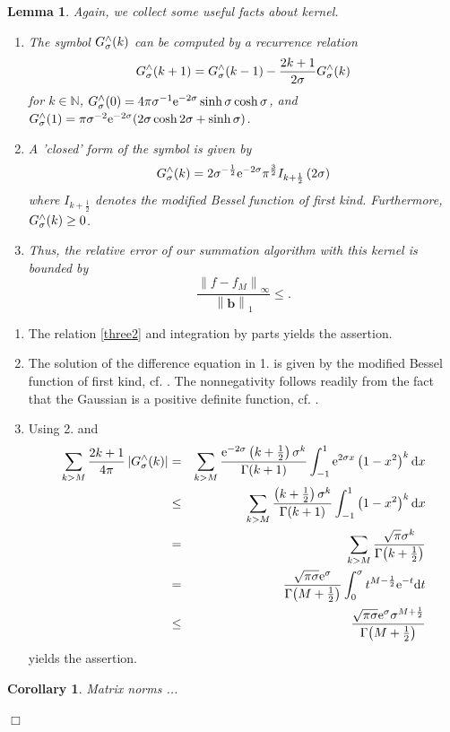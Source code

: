 \documentclass[11pt,a4paper,twoside,bibtotoc]{scrartcl}
\theoremstyle{plain}
\newtheorem{corollary}[theorem]{Corollary}
\newtheorem{lemma}[theorem]{Lemma}
\theoremstyle{definition}
\theoremstyle{remark}
\newenvironment{proof}{{\bf Proof.}}{$\Box$}
\newcommand{\N}{\ensuremath{\mathbb{N}}}
\newcommand{\abs}[1]{\ensuremath{\left\vert#1\right\vert}}
\newcommand{\fun}[2]{\ensuremath{#1{\hspace{-0.4ex}}\left(#2\right)}}
\newcommand{\mb}[1]{\mathbf{#1}}
\newcommand{\V}[1]{\mb{#1}}
\newcommand{\dx}{\text{\rm{d}}}
\newcommand{\e}{\mbox{\rm{e}}}
\numberwithin{equation}{section}
\numberwithin{table}{section}
\numberwithin{figure}{section}
\begin{document}
\begin{lemma}
  Again, we collect some useful facts about kernel.
  \begin{enumerate}
  \item The symbol $\fun{G_{\sigma}^{\wedge}}{k}$ can be computed by a
    recurrence relation
    \[
    \fun{G_{\sigma}^{\wedge}}{k+1} = 
    \fun{G_{\sigma}^{\wedge}}{k-1}   - \frac{2k+1}{2\sigma}
    \fun{G_{\sigma}^{\wedge}}{k}
    \]
    for $k\in \N$, $\fun{G_{\sigma}^{\wedge}}{0} = 4 \pi \sigma^{-1}
    \e^{-2\sigma} \sinh \sigma \cosh \sigma$, and
    $\fun{G_{\sigma}^{\wedge}}{1} = \pi \sigma^{-2} \e^{-2\sigma} (2 \sigma
    \cosh 2 \sigma + \sinh \sigma )$.
  \item A 'closed' form of the symbol is given by
    \[
    \fun{G_{\sigma}^{\wedge}}{k} = 2 \sigma^{-\frac{1}{2}} \e^{-2\sigma}
    \pi^{\frac{3}{2}} I_{k+\frac{1}{2}}\left(2\sigma\right)
    \]
    where $I_{k+\frac{1}{2}}$ denotes the modified Bessel function of first kind.
    Furthermore, $\fun{G_{\sigma}^{\wedge}}{k} \ge 0$.
  \item Thus, the relative error of our summation algorithm with this kernel
  is bounded by
  \begin{equation}
    \label{error:G}
    \frac{\left\|f - f_{M}\right\|_{\infty}}{\left\|\V{b}\right\|_1} \le
    .
  \end{equation} 
\end{enumerate}
\end{lemma}
\begin{proof}
  \begin{enumerate}
  \item The relation \eqref{three2} and integration by parts yields the
  assertion.
  \item The solution of the difference equation in 1. is given by the modified
  Bessel function of first kind, cf. \cite{}.
  The nonnegativity follows readily from the fact that the Gaussian is a
  positive definite function, cf. \cite{}.
  \item Using 2. and
  \begin{eqnarray*}
    \sum_{k>M} \frac{2k+1}{4\pi} \abs{\fun{G_{\sigma}^{\wedge}}{k}}
    &=&
    \sum_{k>M} \frac{\e^{-2\sigma}
    \left(k+\frac{1}{2}\right)\sigma^k}{\fun{\Gamma}{k+1}} \int_{-1}^{1}
    \e^{2\sigma x} \left(1-x^2\right)^k \dx x\\
    &\le&
    \sum_{k>M} \frac{\left(k+\frac{1}{2}\right)\sigma^k}{\fun{\Gamma}{k+1}}
    \int_{-1}^{1} \left(1-x^2\right)^k \dx x\\
    &=&
    \sum_{k>M} \frac{\sqrt{\pi}\sigma^k}{\fun{\Gamma}{k+\frac{1}{2}}}\\
    &=&
    \frac{\sqrt{\pi\sigma}\e^{\sigma}}{\fun{\Gamma}{M+\frac{1}{2}}} 
    \int_{0}^{\sigma} t^{M-\frac{1}{2}} \e^{-t} \dx t\\
    &\le&
    \frac{\sqrt{\pi\sigma}\e^{\sigma} \sigma^{M+\frac{1}{2}}}{\fun{\Gamma}{M
    +\frac{1}{2}}}
  \end{eqnarray*}
  yields the assertion.
\end{enumerate}

\begin{corollary}
 Matrix norms ...
\end{corollary}
\end{proof}
\end{document}
